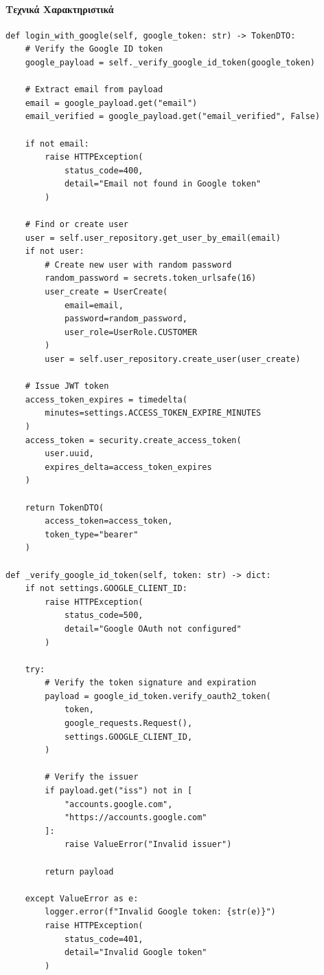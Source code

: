 \documentclass[12pt,a4paper]{report}
\begin{document}
\paragraph{Τεχνικά Χαρακτηριστικά}

\begin{lstlisting}[caption=Google OAuth2 Login]
def login_with_google(self, google_token: str) -> TokenDTO:
    # Verify the Google ID token
    google_payload = self._verify_google_id_token(google_token)
    
    # Extract email from payload
    email = google_payload.get("email")
    email_verified = google_payload.get("email_verified", False)
    
    if not email:
        raise HTTPException(
            status_code=400, 
            detail="Email not found in Google token"
        )
    
    # Find or create user
    user = self.user_repository.get_user_by_email(email)
    if not user:
        # Create new user with random password
        random_password = secrets.token_urlsafe(16)
        user_create = UserCreate(
            email=email,
            password=random_password,
            user_role=UserRole.CUSTOMER
        )
        user = self.user_repository.create_user(user_create)
    
    # Issue JWT token
    access_token_expires = timedelta(
        minutes=settings.ACCESS_TOKEN_EXPIRE_MINUTES
    )
    access_token = security.create_access_token(
        user.uuid, 
        expires_delta=access_token_expires
    )
    
    return TokenDTO(
        access_token=access_token, 
        token_type="bearer"
    )

def _verify_google_id_token(self, token: str) -> dict:
    if not settings.GOOGLE_CLIENT_ID:
        raise HTTPException(
            status_code=500, 
            detail="Google OAuth not configured"
        )
    
    try:
        # Verify the token signature and expiration
        payload = google_id_token.verify_oauth2_token(
            token,
            google_requests.Request(),
            settings.GOOGLE_CLIENT_ID,
        )
        
        # Verify the issuer
        if payload.get("iss") not in [
            "accounts.google.com", 
            "https://accounts.google.com"
        ]:
            raise ValueError("Invalid issuer")
        
        return payload
        
    except ValueError as e:
        logger.error(f"Invalid Google token: {str(e)}")
        raise HTTPException(
            status_code=401, 
            detail="Invalid Google token"
        )
\end{lstlisting}
\end{document}
